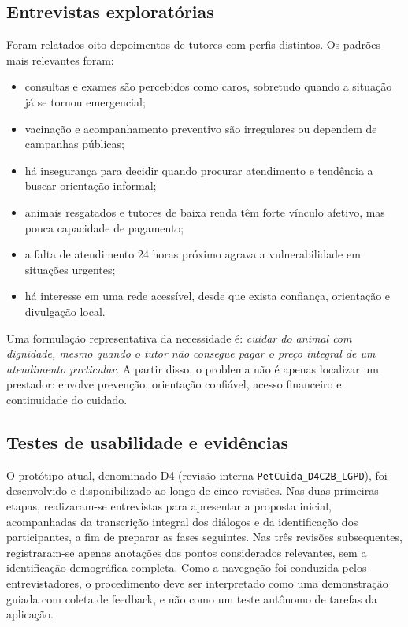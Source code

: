 \documentclass[12pt,a4paper]{article}
\begin{document}
\subsection{Entrevistas exploratórias}
Foram relatados oito depoimentos de tutores com perfis distintos. Os padrões mais relevantes foram:
\begin{itemize}[leftmargin=*]
  \item consultas e exames são percebidos como caros, sobretudo quando a situação já se tornou emergencial;
  \item vacinação e acompanhamento preventivo são irregulares ou dependem de campanhas públicas;
  \item há insegurança para decidir quando procurar atendimento e tendência a buscar orientação informal;
  \item animais resgatados e tutores de baixa renda têm forte vínculo afetivo, mas pouca capacidade de pagamento;
  \item a falta de atendimento 24 horas próximo agrava a vulnerabilidade em situações urgentes;
  \item há interesse em uma rede acessível, desde que exista confiança, orientação e divulgação local.
\end{itemize}

Uma formulação representativa da necessidade é: \textit{cuidar do animal com dignidade, mesmo quando o tutor não consegue pagar o preço integral de um atendimento particular}. A partir disso, o problema não é apenas localizar um prestador: envolve prevenção, orientação confiável, acesso financeiro e continuidade do cuidado.

\subsection{Testes de usabilidade e evidências}
O protótipo atual, denominado D4 (revisão interna \texttt{PetCuida\_D4C2B\_LGPD}), foi desenvolvido e disponibilizado ao longo de cinco revisões. Nas duas primeiras etapas, realizaram-se entrevistas para apresentar a proposta inicial, acompanhadas da transcrição integral dos diálogos e da identificação dos participantes, a fim de preparar as fases seguintes. Nas três revisões subsequentes, registraram-se apenas anotações dos pontos considerados relevantes, sem a identificação demográfica completa. Como a navegação foi conduzida pelos entrevistadores, o procedimento deve ser interpretado como uma demonstração guiada com coleta de feedback, e não como um teste autônomo de tarefas da aplicação.
\end{document}
